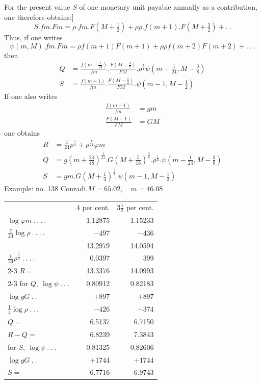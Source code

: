 For the present value \(S\) of one monetary unit payable annually as a contribution, one therefore obtains:]
\[
S\mathord{.}fm\mathord{.}Fm=\rho\mathord{.}fm\mathord{.}F(M+\tfrac{1}{2})+\rho\rho\mathord{.}f(m+1)\mathord{.}F(M+\tfrac{3}{2})+.\ .
\]
\noindent Thus, if one writes
\[
\psi(m,M)\mathord{.}fm\mathord{.}Fm=\rho f(m+1)F(m+1)+\rho\rho f(m+2)F(m+2)+.\ .\ .
\]
\noindent then
\[
\begin{aligned}
Q&=\frac{f(m-\tfrac{1}{24})}{fm}\mathord{.}\frac{F(M-\tfrac{3}{8})}{FM}\mathord{.}\rho^{\frac{1}{4}}\psi(m-\tfrac{1}{24},M-\tfrac{3}{8})\\[5pt]
S&=\frac{f(m-1)}{fm}\mathord{.}\frac{F(M-\tfrac{1}{2})}{FM}\mathord{.}\psi(m-1,M-\tfrac{1}{2})
\end{aligned}
\]
\noindent If one also writes
\[
\begin{aligned}
\frac{f(m-1)}{fm}&=gm\\[5pt]
\frac{F(M-1)}{FM}&=GM
\end{aligned}
\]
\noindent one obtains
\[
\begin{aligned}
R&=\tfrac{1}{24}\rho^{\frac{5}{4}}+\rho^{\frac{7}{24}}\varphi m\\
Q&=g(m+\tfrac{23}{48})^{\frac{1}{24}}\mathord{.}G(M+\tfrac{5}{16})^{\frac{3}{8}}\mathord{.}\rho^{\frac{1}{4}}\mathord{.}\psi(m-\tfrac{1}{24},M-\tfrac{3}{8})\\
S&=gm\mathord{.}G(M+\tfrac{1}{4})^{\frac{1}{2}}\mathord{.}\psi(m-1,M-\tfrac{1}{2})
\end{aligned}
\]
Example: no. 138 Conradi.\quad \(M=65.02,\quad m=46.08\)
\begin{center}
\fontsize{9}{14}\selectfont\setlength{\tabcolsep}{5pt}
\begin{tabular}{lrr}
&4 per cent.&\(3\tfrac{1}{2}\) per cent.\\
\(\log\varphi m\ .\ .\ .\ .\)&1.12875&1.15233\\
\(\tfrac{7}{24}\log\rho\ .\ .\ .\ .\)&\(-497\)&\(-436\)\\
&13.2979&14.0594\\
\(\tfrac{1}{24}\rho^{\frac{5}{4}}\ .\ .\ .\ .\)&0.0397&399\\\cline{2-3}
\(R=\)&13.3376&14.0993\\\cline{2-3}
for \(Q,\ \log\psi\ .\ .\ .\)&0.80912&0.82183\\
\(\log gG\ .\ .\)&\(+897\)&\(+897\)\\
\(\tfrac{1}{4}\log\rho\ .\ .\ .\)&\(-426\)&\(-374\)\\
\(Q=\)&6.5137&6.7150\\
\(R-Q=\)&6.8239&7.3843\\\hline
for \(S,\ \log\psi\ .\ .\ .\)&0.81325&0.82606\\
\(\log gG\ .\ .\)&\(+1744\)&\(+1744\)\\
\(S=\)&6.7716&6.9743\\\hline
\end{tabular}
\end{center}
